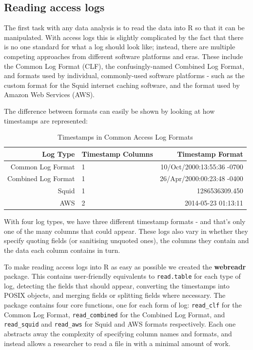 \subsection{Reading access logs}\label{reading-access-logs}

The first task with any data analysis is to read the data into R so that
it can be manipulated. With access logs this is slightly complicated by
the fact that there is no one standard for what a log should look like;
instead, there are multiple competing approaches from different software
platforms and eras. These include the Common Log Format (CLF), the
confusingly-named Combined Log Format, and formats used by individual,
commonly-used software platforms - such as the custom format for the
Squid internet caching software, and the format used by Amazon Web
Services (AWS).

The difference between formats can easily be shown by looking at how
timestamps are represented:

\begin{table}[ht]
\centering
\caption{Timestamps in Common Access Log Formats}
\begin{tabular}{rlr}
  \hline
Log Type & Timestamp Columns & Timestamp Format \\ 
  \hline
Common Log Format & 1 & 10/Oct/2000:13:55:36 -0700\\ 
Combined Log Format & 1 & 26/Apr/2000:00:23:48 -0400\\ 
Squid & 1 & 1286536309.450\\ 
AWS & 2 & 2014-05-23    01:13:11\\ 
   \hline
\end{tabular}
\end{table}

With four log types, we have three different timestamp formats - and
that's only one of the many columns that could appear. These logs also
vary in whether they specify quoting fields (or sanitising unquoted
ones), the columns they contain and the data each column contains in
turn.

To make reading access logs into R as easy as possible we created the
\textbf{webreadr} package. This contains user-friendly equivalents to
\texttt{read.table} for each type of log, detecting the fields that
should appear, converting the timestamps into POSIX objects, and merging
fields or splitting fields where necessary. The package contains four
core functions, one for each form of log: \texttt{read\_clf} for the
Common Log Format, \texttt{read\_combined} for the Combined Log Format,
and \texttt{read\_squid} and \texttt{read\_aws} for Squid and AWS
formats respectively. Each one abstracts away the complexity of
specifying column names and formats, and instead allows a researcher to
read a file in with a minimal amount of work.

